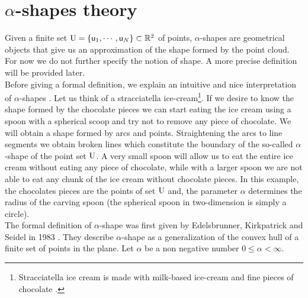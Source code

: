 \section{$\alpha$-shapes theory}\label{sec:alpha-shapes}
Given a finite set $\mbox{$\textup{U}$} = \{\textsf{u}_1, \cdots, \textsf{u}_N\}\subset \mathbb{R}^2$ of points, $\alpha$-shapes are geometrical objects that give us an approximation of the shape formed by the point cloud. For now we do not further specify the notion of shape. A more precise definition will be provided later.\\ \indent
Before giving a formal definition, we explain an intuitive and nice interpretation of $\alpha$-shapes \cite{lucieer2004alpha}. 
Let us think of a stracciatella ice-cream\footnote{Stracciatella ice cream is made with milk-based ice-cream and fine pieces of chocolate \cite{Wiki3}.}. If we desire to know the shape formed by the chocolate pieces we can start eating the ice cream using a spoon with a spherical scoop and try not to remove any piece of chocolate. 
We will obtain a shape formed by arcs and points. %
Straightening the arcs to line segments we obtain broken lines which constitute the boundary of the so-called $\alpha$-shape of the point set $\mbox{$\textup{U}$}$. 
A very small spoon will allow us to eat the entire ice cream without eating any piece of chocolate, while with a larger spoon we are not able to eat any chunk of the ice cream without chocolate pieces. In this example, the chocolates pieces are the points of set $\mbox{$\textup{U}$}$ and, the parameter $\alpha$ determines the radius of the carving spoon (the spherical spoon in two-dimension is simply a circle).\\ \indent 
The formal definition of $\alpha$-shape was first given by Edelsbrunner, Kirkpatrick and Seidel in 1983 \cite{edelsbrunner1983shape}. They describe $\alpha$-shape as a generalization of the convex hull of a finite set of points in the plane. Let $\alpha$ be a non negative number $0\leq\alpha<\infty$. 
